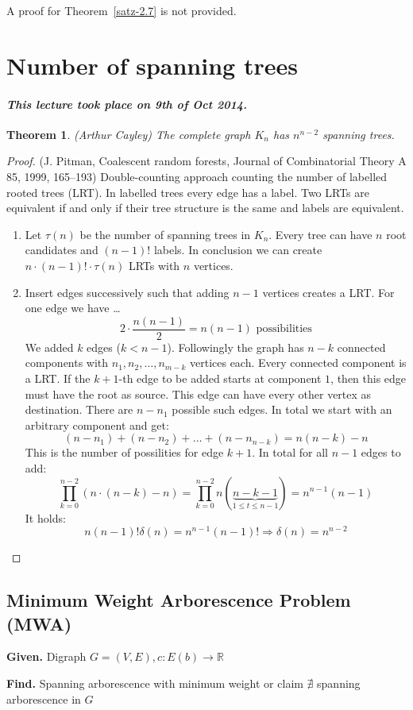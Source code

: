 \documentclass{article}
\newtheorem{theorem}{Theorem}
\newcommand{\given}[1]{\textbf{Given.} #1\par}
\newcommand{\find}[1]{\textbf{Find.} #1\par}
\newcommand{\dateref}[1]{\paragraph{\textit{This lecture took place on #1.}}}
\begin{document}
A proof for Theorem~\ref{satz-2.7} is not provided.

\section{Number of spanning trees}

\dateref{9th of Oct 2014}

\begin{theorem}\label{satz-2.8}
  (Arthur Cayley)
  The complete graph $K_n$ has $n^{n-2}$ spanning trees.
\end{theorem}

\begin{proof}
(J. Pitman, Coalescent random forests, Journal of Combinatorial Theory A 85, 1999, 165--193)
Double-counting approach counting the number of labelled rooted trees (LRT). In labelled trees every edge has a label. Two LRTs are equivalent if and only if their tree structure is the same and labels are equivalent.

\begin{enumerate}
  \item Let $\tau(n)$ be the number of spanning trees in $K_n$. Every tree can have $n$ root candidates and $(n-1)!$ labels. In conclusion we can create $n \cdot (n-1)! \cdot \tau(n)$ LRTs with $n$ vertices.
  \item Insert edges successively such that adding $n-1$ vertices creates a LRT. For one edge we have \dots
    \[
      2 \cdot \frac{n(n-1)}{2} = n(n-1) \text{ possibilities}
    \]
    We added $k$ edges ($k < n -1$). Followingly the graph has $n-k$ connected components with $n_1, n_2, \ldots, n_{m-k}$ vertices each. Every connected component is a LRT. If the $k+1$-th edge to be added starts at component $1$, then this edge must have the root as source. This edge can have every other vertex as destination. There are $n-n_1$ possible such edges. In total we start with an arbitrary component and get:
    \[
      (n - n_1) + (n - n_2) + \ldots + (n - n_{n-k}) = n (n-k) - n
    \]
    This is the number of possilities for edge $k+1$.
    In total for all $n-1$ edges to add:
    \[
      \prod_{k=0}^{n-2} (n \cdot (n-k) - n) = \prod_{k=0}^{n-2} n (\underbrace{n - k - 1}_{1 \leq t \leq n-1}) = n^{n-1} (n - 1)
    \]
    It holds:
    \[
      n (n-1) ! \delta(n) = n^{n-1} (n-1)! \Rightarrow \delta(n) = n^{n-2}
    \]
\end{enumerate}
\end{proof}

\subsection{Minimum Weight Arborescence Problem (MWA)}
%
\given{Digraph $G = (V, E), c: E(b) \rightarrow \mathbb{R}$}
\find{Spanning arborescence with minimum weight or claim $\nexists$ spanning arborescence in $G$}
%
\end{document}
